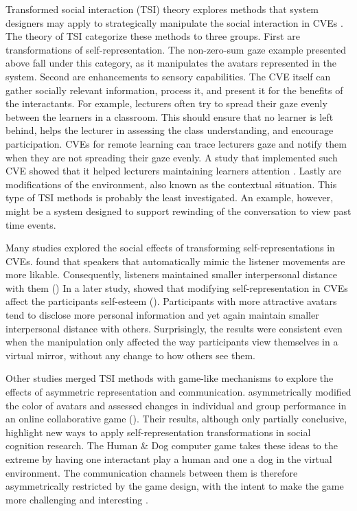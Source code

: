 \documentclass[]{simple-thesis}
\begin{document}
Transformed social interaction (TSI) theory explores methods that system designers may apply to strategically manipulate the social interaction in CVEs \citep{Bailenson2004}.
The theory of TSI categorize these methods to three groups.
First are transformations of self-representation.
The non-zero-sum gaze example presented above fall under this category, as it manipulates the avatars represented in the system.
Second are enhancements to sensory capabilities.
The CVE itself can gather socially relevant information, process it, and present it for the benefits of the interactants.
For example, lecturers often try to spread their gaze evenly between the learners in a classroom.
This should ensure that no learner is left behind, helps the lecturer in assessing the class understanding, and encourage participation.
CVEs for remote learning can trace lecturers gaze and notify them when they are not spreading their gaze evenly.
A study that implemented such CVE showed that it helped lecturers maintaining learners attention \citep{Bailenson2008b}.
Lastly are modifications of the environment, also known as the contextual situation.
This type of TSI methods is probably the least investigated.
An example, however, might be a system designed to support rewinding of the conversation to view past time events.

Many studies explored the social effects of transforming self-representations in CVEs.
\citeauthor{Bailenson2005} found that speakers that automatically mimic the listener movements are more likable.
Consequently, listeners maintained smaller interpersonal distance with them (\citeyear{Bailenson2005})
In a later study, \citeauthor{Bailenson2008a} showed that modifying self-representation in CVEs affect the participants self-esteem (\citeyear{Bailenson2008a}).
Participants with more attractive avatars tend to disclose more personal information and yet again maintain smaller interpersonal distance with others.
Surprisingly, the results were consistent even when the manipulation only affected the way participants view themselves in a virtual mirror, without any change to how others see them.

Other studies merged TSI methods with game-like mechanisms to explore the effects of asymmetric representation and communication.
\citeauthor{Dominguez2014} asymmetrically modified the color of avatars and assessed changes in individual and group performance in an online collaborative game (\citeyear{Dominguez2014}).
Their results, although only partially conclusive, highlight new ways to apply self-representation transformations in social cognition research.
The Human \& Dog computer game takes these ideas to the extreme by having one interactant play a human and one a dog in the virtual environment.
The communication channels between them is therefore asymmetrically restricted by the game design, with the intent to make the game more challenging and interesting \citep{Chou2016, Hou2017}.
\end{document}
